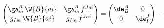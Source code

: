 \begin{equation} \label{more-contr}
  \begin{pmatrix} \ga_{ia}^A\, \W{B}{ai} & \ga_{ia}^A\, f^{Jai} \\[2pt]
  g_{Iia}\, \W{B}{ai} & g_{Iia}\, f^{Jai} \end{pmatrix} 
  = \begin{pmatrix} \de_B^A & 0 \\[2pt] 0 & \de_I^J \end{pmatrix}\ .
 \end{equation}

